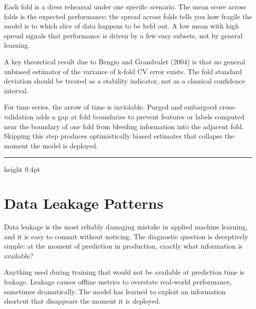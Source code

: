 \documentclass[12pt,a4paper]{article}
\begin{document}
\begin{analogy}
Each fold is a dress rehearsal under one specific scenario. The mean score
across folds is the expected performance; the spread across folds tells you
how fragile the model is to which slice of data happens to be held out.
A low mean with high spread signals that performance is driven by a few
easy subsets, not by general learning.
\end{analogy}

A key theoretical result due to Bengio and Grandvalet (2004) is that no
general unbiased estimator of the variance of k-fold CV error exists.
The fold standard deviation should be treated as a stability indicator,
not as a classical confidence interval.

\begin{mentalmodel}
For time series, the arrow of time is inviolable. Purged and embargoed
cross-validation adds a gap at fold boundaries to prevent features or
labels computed near the boundary of one fold from bleeding information
into the adjacent fold. Skipping this step produces optimistically biased
estimates that collapse the moment the model is deployed.
\end{mentalmodel}

\vspace{10pt}\hrule height 0.4pt\vspace{14pt}

\section*{Data Leakage Patterns}

Data leakage is the most reliably damaging mistake in applied machine
learning, and it is easy to commit without noticing. The diagnostic
question is deceptively simple: at the moment of prediction in production,
exactly what information is available?

\begin{concept}
Anything used during training that would not be available at prediction
time is leakage. Leakage causes offline metrics to overstate real-world
performance, sometimes dramatically. The model has learned to exploit an
information shortcut that disappears the moment it is deployed.
\end{concept}
\end{document}
